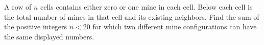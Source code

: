 A row of $n$ cells contains either zero or one mine in each cell. Below each cell is the total number of mines in that cell and its existing neighbors. Find the sum of the positive integers $n<20$ for which two different mine configurations can have the same displayed numbers.

